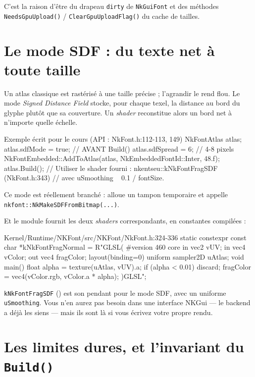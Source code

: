 C'est la raison d'être du drapeau \texttt{dirty} de \texttt{NkGuiFont} et des
méthodes \texttt{NeedsGpuUpload()} / \texttt{ClearGpuUploadFlag()} du cache de
tailles.

\section{Le mode SDF : du texte net à toute taille}

Un atlas classique est rastérisé à une taille précise ; l'agrandir le rend flou.
Le mode \emph{Signed Distance Field} stocke, pour chaque texel, la distance au
bord du glyphe plutôt que sa couverture. Un \emph{shader} reconstitue alors un
bord net à n'importe quelle échelle.

\begin{nkcode}{Exemple écrit pour le cours (API : NkFont.h:112-113, 149)}
NkFontAtlas atlas;
atlas.sdfMode   = true;      // AVANT Build()
atlas.sdfSpread = 6;         // 4-8 pixels
NkFontEmbedded::AddToAtlas(atlas, NkEmbeddedFontId::Inter, 48.f);
atlas.Build();
// Utiliser le shader fourni : nkentseu::kNkFontFragSDF (NkFont.h:343)
// avec uSmoothing ~ 0.1 / fontSize.
\end{nkcode}

Ce mode est réellement branché :  alloue un
tampon temporaire et appelle \texttt{nkfont::NkMakeSDFFromBitmap(...)}.

Et le module fournit les deux \emph{shaders} correspondants, en constantes
compilées :

\begin{nkcode}{Kernel/Runtime/NKFont/src/NKFont/NkFont.h:324-336}
    static constexpr const char *kNkFontFragNormal = R"GLSL(
#version 460 core
in vec2 vUV;
in vec4 vColor;
out vec4 fragColor;
layout(binding=0) uniform sampler2D uAtlas;
void main() {
    float alpha = texture(uAtlas, vUV).a;
    if (alpha < 0.01) discard;
    fragColor = vec4(vColor.rgb, vColor.a * alpha);
}
)GLSL";
\end{nkcode}

\texttt{kNkFontFragSDF} () est son pendant pour le mode SDF,
avec un uniforme \texttt{uSmoothing}. Vous n'en aurez pas besoin dans une
interface NKGui — le backend a déjà les siens — mais ils sont là si vous écrivez
votre propre rendu.

\section{Les limites dures, et l'invariant du \texttt{Build()}}

